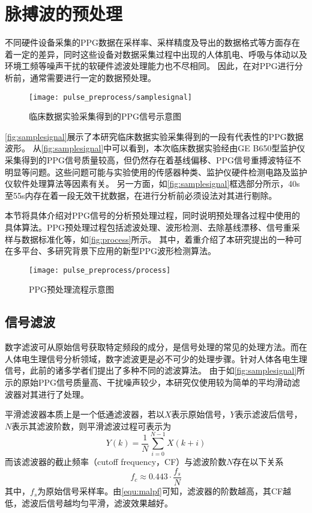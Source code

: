 \section{脉搏波的预处理}
不同硬件设备采集的PPG数据在采样率、采样精度及导出的数据格式等方面存在着一定的差异，同时这些设备对数据采集过程中出现的人体肌电、呼吸与体动以及环境工频等噪声干扰的软硬件滤波处理能力也不尽相同。
因此，在对PPG进行分析前，通常需要进行一定的数据预处理。

\begin{figure}[htbp]
    \centering
    \texttt{[image: pulse\_preprocess/samplesignal]}
    \caption{\label{fig:samplesignal}临床数据实验采集得到的PPG信号示意图}
\end{figure}

\autoref{fig:samplesignal}展示了本研究临床数据实验采集得到的一段有代表性的PPG数据波形。
从\autoref{fig:samplesignal}中可以看到，本次临床数据实验经由GE B650型监护仪采集得到的PPG信号质量较高，但仍然存在着基线偏移、PPG信号重搏波特征不明显等问题。这些问题可能与实验使用的传感器种类、监护仪硬件检测电路及监护仪软件处理算法等因素有关。
另一方面，如\autoref{fig:samplesignal}框选部分所示，40s至55s内存在着一段无效干扰数据，在进行分析前必须设法对其进行剔除。

本节将具体介绍对PPG信号的分析预处理过程，同时说明预处理各过程中使用的具体算法。PPG预处理过程包括滤波处理、波形检测、去除基线漂移、信号重采样与数据标准化等，如\autoref{fig:process}所示。
其中，着重介绍了本研究提出的一种可在多平台、多研究背景下应用的新型PPG波形检测算法。
\begin{figure}[htbp]
    \centering
    \texttt{[image: pulse\_preprocess/process]}
    \caption{\label{fig:process}PPG预处理流程示意图}
\end{figure}

\subsection{信号滤波}
数字滤波可从原始信号获取特定频段的成分，是信号处理的常见的处理方法。而在人体电生理信号分析领域，数字滤波更是必不可少的处理步骤。针对人体各电生理信号，此前的诸多学者们提出了多种不同的滤波算法。
由于如\autoref{fig:samplesignal}所示的原始PPG信号质量高、干扰噪声较少，本研究仅使用较为简单的平均滑动滤波器对其进行了处理。

平滑滤波器本质上是一个低通滤波器，若以$X$表示原始信号，$Y$表示滤波后信号，$N$表示其滤波阶数，则平滑滤波过程可表示为
\begin{equation}
    \label{equ:filter}
    Y(k)=\frac{1}{N}\sum_{i=0}^{N-1}X(k+i)
\end{equation}
而该滤波器的截止频率（cutoff frequency，CF）与滤波阶数$N$存在以下关系\cite{malp2011}
\begin{equation}
    \label{equ:malpf}
    f_{c} \approx 0.443 \cdot \frac{f_s}{N}    
\end{equation}
其中，$f_s$为原始信号采样率。由\autoref{equ:malpf}可知，滤波器的阶数越高，其CF越低，滤波后信号越均匀平滑，滤波效果越好。

